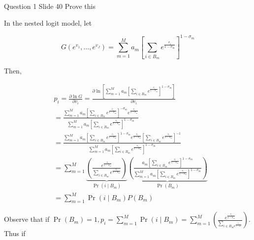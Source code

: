\documentclass{article}
\begin{document}
\begin{problem}{Question 1 Slide 40}
Prove this
\end{problem}
\begin{solution}
In the nested logit model, let

\begin{equation*}
G\left(e^{v_{1}}, \ldots, e^{v_{J}}\right)=\sum_{m=1}^{M} a_{m}\left[\sum_{i \in B_{m}} e^{\frac{v_{i}}{1-\sigma_{m}}}\right]^{1-\sigma_{m}}
\end{equation*}

Then,

\begin{equation*}
\begin{aligned}
& p_{i}=\frac{\partial \ln G}{\partial v_{i}}=\frac{\partial \ln \left[\sum_{m=1}^{M} a_{m}\left[\sum_{i \in B_{m}} e^{\frac{v_{i}}{1-\sigma_{m}}}\right]^{1-\sigma_{m}}\right]}{\partial v_{i}} \\
& =\frac{\sum_{m=1}^{M} a_{m}\left[\sum_{i \in B_{m}} e^{\frac{v_{i}}{1-\sigma_{m}}}\right]^{-\sigma_{m}} e^{\frac{v_{i}}{1-\sigma_{m}}}}{\sum_{m=1}^{M} a_{m}\left[\sum_{i \in B_{m}} e^{\frac{v_{i}}{1-\sigma_{m}}}\right]^{1-\sigma_{m}}} \\
& =\frac{\sum_{m=1}^{M} a_{m}\left[\sum_{i \in B_{m}} e^{\frac{v_{i}}{1-\sigma_{m}}}\right]^{1-\sigma_{m}} e^{\frac{v_{i}}{1-\sigma_{m}}}\left[\sum_{i \in B_{m}} e^{\frac{v_{i}}{1-\sigma_{m}}}\right]^{-1}}{\sum_{m=1}^{M} a_{m}\left[\sum_{i \in B_{m}} e^{\frac{v_{i}}{1-\sigma_{m}}}\right]^{1-\sigma_{m}}} \\
& =\sum_{m=1}^{M} \underbrace{\left(\frac{e^{\frac{v_{i}}{1-\sigma_{m}}}}{\sum_{i \in B_{m}} e^{\frac{v_{i}}{1-\sigma_{m}}}}\right)}_{\Pr\left(i \mid B_{m}\right)} \underbrace{\left(\frac{a_{m}\left[\sum_{i \in B_{m}} e^{\frac{v_{i}}{1-\sigma_{m}}}\right]^{1-\sigma_{m}}}{\sum_{m=1}^{M} a_{m}\left[\sum_{i \in B_{m}} e^{\frac{v_{i}}{1-\sigma_{m}}}\right]^{1-\sigma_{m}}}\right)}_{\Pr\left(B_{m}\right)} \\
& =\sum_{m=1}^{M} \Pr\left(i \mid B_{m}\right) P\left(B_{m}\right)
\end{aligned}
\end{equation*}

Observe that if $\Pr\left(B_{m}\right)=1, p_{i}=\sum_{m=1}^{M} \Pr\left(i \mid B_{m}\right)=\sum_{m=1}^{M}\left(\frac{e^{\frac{v_{i}}{1-\sigma_{m}}}}{\sum_{i \in B_{m} e^{\frac{v_{i}}{1-\sigma_{m}}}}}\right)$. Thus if 
\end{solution}
\end{document}
